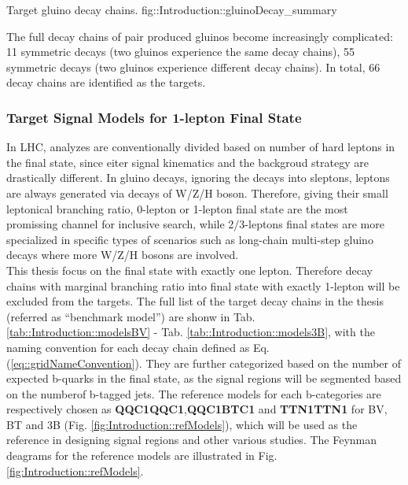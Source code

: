 {Target gluino decay chains.}
{fig::Introduction::gluinoDecay_summary}


The full decay chains of pair produced gluinos become increasingly complicated: 11 symmetric decays (two gluinos experience the same decay chains), 55 symmetric decays (two gluinos experience different decay chains).
In total, 66 decay chains are identified as the targets. \\


\subsubsection{Target Signal Models for 1-lepton Final State}
In LHC, analyzes are conventionally divided based on number of hard leptons in the final state, since eiter signal kinematics and the backgroud strategy are drastically different. In gluino decays, ignoring the decays into sleptons, leptons are always generated via decays of W/Z/H boson. Therefore, giving their small leptonical branching ratio, 0-lepton or 1-lepton final state are the most promissing channel for inclusive search, while 2/3-leptons final states are more specialized in specific types of scenarios such as long-chain multi-step gluino decays where more W/Z/H bosons are involved. \\

This thesis focus on the final state with exactly one lepton. 
Therefore decay chains with marginal branching ratio into final state with exactly 1-lepton will be excluded from the targets. 
The full list of the target decay chains in the thesis (referred as ``benchmark model'') are shonw in Tab. \ref{tab::Introduction::modelsBV} - Tab. \ref{tab::Introduction::models3B}, with the naming convention for each decay chain defined as Eq. (\ref{eq::gridNameConvention}). They are further categorized based on the number of expected b-quarks in the final state, as the signal regions will be segmented based on the numberof b-tagged jets. The reference models for each b-categories are respectively chosen as \textbf{QQC1QQC1},\textbf{QQC1BTC1} and \textbf{TTN1TTN1} for BV, BT and 3B (Fig. \ref{fig:Introduction::refModels}), which will be used as the reference in designing signal regions and other various studies. The Feynman deagrams for the reference models are illustrated in Fig. \ref{fig:Introduction::refModels}.


